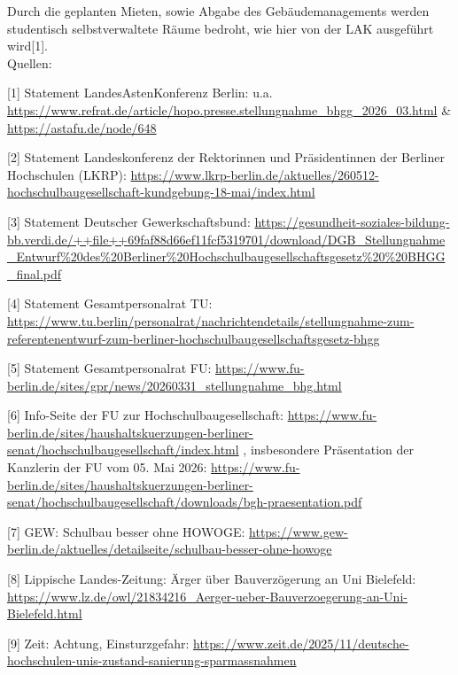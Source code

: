 \documentclass[DIV=calc]{scrartcl}
\begin{document}
 Durch die geplanten Mieten, sowie Abgabe des Gebäudemanagements werden studentisch selbstverwaltete Räume bedroht, wie hier von der LAK ausgeführt wird[1].\\


Quellen:

 {[1]} Statement LandesAstenKonferenz Berlin: u.a.
 \url{https://www.refrat.de/article/hopo.presse.stellungnahme_bhgg_2026_03.html} \&
 \url{https://astafu.de/node/648}
 
 {[2]} Statement Landeskonferenz der Rektorinnen und Präsidentinnen der Berliner
 Hochschulen (LKRP):
 \url{https://www.lkrp-berlin.de/aktuelles/260512-hochschulbaugesellschaft-kundgebung-18-mai/index.html}
 
{[3]} Statement Deutscher Gewerkschaftsbund:
\url{https://gesundheit-soziales-bildung-bb.verdi.de/++file++69faf88d66ef11fcf5319701/download/DGB_Stellungnahme_Entwurf%20des%20Berliner%20Hochschulbaugesellschaftsgesetz%20%20BHGG_final.pdf}
 
{[4]} Statement Gesamtpersonalrat TU:
 \url{https://www.tu.berlin/personalrat/nachrichtendetails/stellungnahme-zum-referentenentwurf-zum-berliner-hochschulbaugesellschaftsgesetz-bhgg}
 
 {[5]} Statement Gesamtpersonalrat FU:
 \url{https://www.fu-berlin.de/sites/gpr/news/20260331_stellungnahme_bhg.html}
 
{[6]} Info-Seite der FU zur Hochschulbaugesellschaft:
 \url{https://www.fu-berlin.de/sites/haushaltskuerzungen-berliner-senat/hochschulbaugesellschaft/index.html} , insbesondere Präsentation der Kanzlerin
 der FU vom 05. Mai 2026:
 \url{https://www.fu-berlin.de/sites/haushaltskuerzungen-berliner-senat/hochschulbaugesellschaft/downloads/bgh-praesentation.pdf}
 
 {[7]} GEW: Schulbau besser ohne HOWOGE:
 \url{https://www.gew-berlin.de/aktuelles/detailseite/schulbau-besser-ohne-howoge}
 
 {[8]} Lippische Landes-Zeitung: Ärger über Bauverzögerung an Uni Bielefeld:
 \url{https://www.lz.de/owl/21834216_Aerger-ueber-Bauverzoegerung-an-Uni-Bielefeld.html}
 
 {[9]} Zeit: Achtung, Einsturzgefahr:
 \url{https://www.zeit.de/2025/11/deutsche-hochschulen-unis-zustand-sanierung-sparmassnahmen}
 
\end{document}
